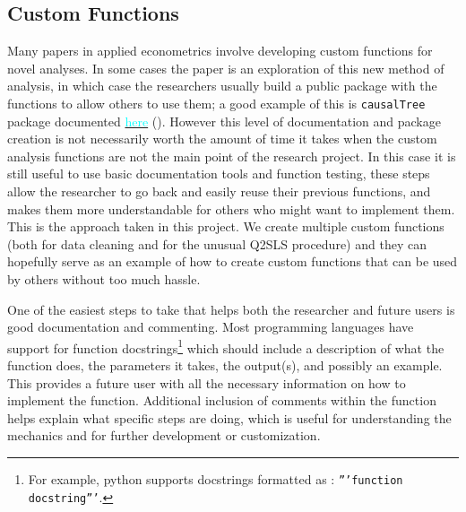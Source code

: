 \documentclass[12pt]{article}
\newcommand{\inlinecode}{\texttt}
\begin{document}
\subsection{Custom Functions}
Many papers in applied econometrics involve developing custom functions for novel analyses. In some cases the paper is an exploration of this new method of analysis, in which case the researchers usually build a public package with the functions to allow others to use them; a good example of this is \inlinecode{causalTree} package documented \href{https://github.com/susanathey/causalTree}{\textcolor{cyan}{here}} (\cite{causalTree}). However this level of documentation and package creation is not necessarily worth the amount of time it takes when the custom analysis functions are not the main point of the research project. In this case it is still useful to use basic documentation tools and function testing, these steps allow the researcher to go back and easily reuse their previous functions, and makes them more understandable for others who might want to implement them. This is the approach taken in this project. We create multiple custom functions (both for data cleaning and for the unusual Q2SLS procedure) and they can hopefully serve as an example of how to create custom functions that can be used by others without too much hassle. 

One of the easiest steps to take that helps both the researcher and future users is good documentation and commenting. Most programming languages have support for function docstrings\footnote{For example, python supports docstrings formatted as : \inlinecode{'''function docstring'''}.} which should include a description of what the function does, the parameters it takes, the output(s), and possibly an example. This provides a future user with all the necessary information on how to implement the function. Additional inclusion of comments within the function helps explain what specific steps are doing, which is useful for understanding the mechanics and for further development or customization.
\end{document}
